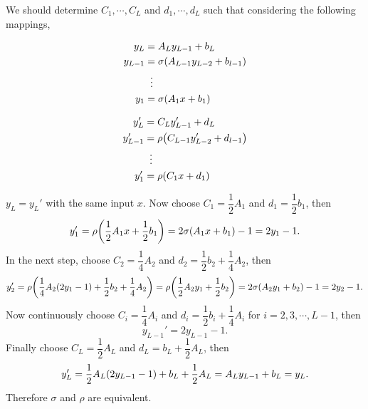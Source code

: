 \documentclass[10pt]{article}
\begin{document}
\begin{enumerate}[leftmargin=*, label=(\alph*)]
    We should determine $C_1, \cdots , C_L$ and $ d_1, \cdots , d_L$ such that considering the following mappings,
    \vspace*{-1.1cm}
    \begin{multicols}{2}
        \begin{align*}
            y_L &= A_Ly_{L-1} + b_L \\
            y_{L-1} &= \sigma\qty(A_{L-1}y_{L-2} + b_{l-1}) \\
            &\;\;\vdots \\
            y_1 &= \sigma\qty(A_1x + b_1)
        \end{align*}

        \begin{align*}
            y_L' &= C_Ly_{L-1}' + d_L \\
            y_{L-1}' &= \rho\qty(C_{L-1}y_{L-2}' + d_{l-1}) \\
            &\;\;\vdots \\
            y_1' &= \rho\qty(C_1x + d_1)
        \end{align*}
    \end{multicols}
    \vspace*{-2mm}
    $y_L = y_L'$ with the same input $x$.
    Now choose $C_1 = \dfrac{1}{2}A_1$ and $d_1 = \dfrac{1}{2}b_1$, then
    $$y_1' = \rho\qty(\frac{1}{2}A_1x + \frac{1}{2}b_1) = 2\sigma\qty(A_1x + b_1) - 1 = 2y_1 - 1.$$
    In the next step, choose $C_2 = \dfrac{1}{4}A_2$ and $d_2 = \dfrac{1}{2}b_2 + \dfrac{1}{4}A_2$, then
    $$y_2' = \rho\qty(\frac{1}{4}A_2\qty(2y_1 - 1) + \frac{1}{2}b_2 + \frac{1}{4}A_2) = \rho\qty(\frac{1}{2}A_2y_1 + \frac{1}{2}b_2) = 2\sigma\qty(A_2y_1 + b_2) - 1 = 2y_2 - 1.$$
    Now continuously choose $C_i = \dfrac{1}{4}A_i$ and $d_i = \dfrac{1}{2}b_i + \dfrac{1}{4}A_i$ for $i = 2, 3, \cdots , L-1$, then
    $$y_{L-1}' = 2y_{L-1} - 1.$$
    Finally choose $C_L = \dfrac{1}{2}A_L$ and  $d_L = b_L + \dfrac{1}{2}A_L$, then
    $$y_L' = \frac{1}{2}A_L\qty(2y_{L-1} - 1) + b_L + \frac{1}{2}A_L = A_Ly_{L-1} + b_L = y_L.$$
    Therefore $\sigma$ and $\rho$ are equivalent.
\end{enumerate}
\end{document}
